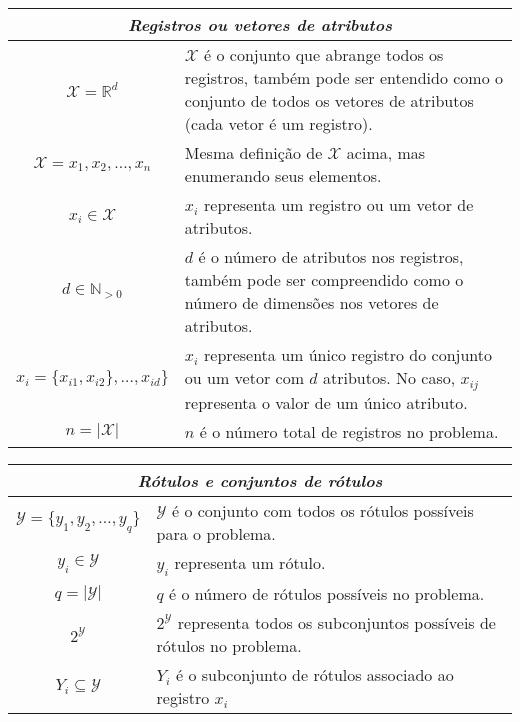 \documentclass[runningheads,a4paper]{llncs}
\begin{document}
\begin{center}
\begin{tabular}{| c | m{9cm} |}
	\hline
	\multicolumn{2}{|c|}{\textit{Registros ou vetores de atributos}} \\
	\hline
	$\mathcal{X} = \mathbb{R}^d$ & $\mathcal{X}$ é o conjunto que abrange todos os registros, também pode ser entendido como o conjunto de todos os vetores de atributos (cada vetor é um registro). \\
	\hline
	$\mathcal{X} = {x_1, x_2, \dots, x_n}$ & Mesma definição de $\mathcal{X}$ acima, mas enumerando seus elementos. \\
	\hline
	$x_i \in \mathcal{X}$ & $x_i$ representa um registro ou um vetor de atributos. \\
	\hline
	$d \in \mathbb{N}_{>0}$ & $d$ é o número de atributos nos registros, também pode ser compreendido como o número de dimensões nos vetores de atributos. \\
	\hline
	$x_i = \{x_{i1}, x_{i2}\}, \dots, x_{id}\}$ & $x_i$ representa um único registro do conjunto ou um vetor com $d$ atributos. No caso, $x_{ij}$ representa o valor de um único atributo. \\
	\hline
	$n = |\mathcal{X}|$ & $n$ é o número total de registros no problema. \\
	\hline
\end{tabular}
\end{center}

\begin{center}
\begin{tabular}{| c | m{9cm} |}
	\hline	
	\multicolumn{2}{|c|}{\textit{Rótulos e conjuntos de rótulos}} \\
	\hline
	$\mathcal{Y} = \{y_1, y_2, \dots, y_q\}$ & $\mathcal{Y}$ é o conjunto com todos os rótulos possíveis para o problema. \\
	\hline
	$y_i \in \mathcal{Y}$ & $y_i$ representa um rótulo. \\
	\hline
	$q = |\mathcal{Y}|$ & $q$ é o número de rótulos possíveis no problema. \\
	\hline
	$2^\mathcal{Y}$ & $2^\mathcal{Y}$ representa todos os subconjuntos possíveis de rótulos no problema. \\
	\hline
	$Y_i \subseteq \mathcal{Y}$ & $Y_i$ é o subconjunto de rótulos associado ao registro $x_i$ \\
	\hline
\end{tabular}
\end{center}
\end{document}

